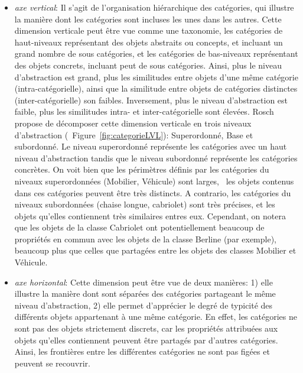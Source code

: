 \begin{itemize}
\item \textit{axe vertical}: Il s'agit de l'organisation hiérarchique des catégories, qui illustre la manière dont les catégories sont incluses les unes dans les autres. Cette dimension verticale peut être vue comme une taxonomie, les catégories de haut-niveaux représentant des objets abstraits ou concepts, et incluant un grand nombre de sous catégories, et les catégories de bas-niveaux représentant des objets concrets, incluant peut de sous catégories. Ainsi, plus le niveau d'abstraction est grand, plus les similitudes entre objets d'une même catégorie (intra-catégorielle), ainsi que la similitude entre objets de catégories distinctes (inter-catégorielle) son faibles. Inversement, plus le niveau d'abstraction est faible, plus les similitudes intra- et inter-catégorielle sont élevées. Rosch propose de décomposer cette dimension verticale en trois niveaux d'abstraction (\Cf~Figure~\ref{fig:categorieLVL}): Superordonné, Base et subordonné. Le niveau superordonné représente les catégories avec un haut niveau d'abstraction tandis que le niveau subordonné représente les catégories concrètes. On voit bien que les périmètres définis par les catégories du niveaux superordonnées (Mobilier, Véhicule) sont larges, \ie~les objets contenus dans ces catégories peuvent être très distincts. A contrario, les catégories du niveaux subordonnées (chaise longue, cabriolet) sont très précises, et les objets qu'elles contiennent très similaires entres eux. Cependant, on notera que les objets de la classe Cabriolet ont potentiellement beaucoup de propriétés en commun avec les objets de la classe Berline (par exemple), beaucoup plus que celles que partagées entre les objets des classes Mobilier et Véhicule. 
\item \textit{axe horizontal}: Cette dimension peut être vue de deux manières: 1) elle illustre la manière dont sont séparées des catégories partageant le même niveau d'abstraction, 2) elle permet d'apprécier le degré de typicité des différents objets appartenant à une même catégorie. En effet, les catégories ne sont pas des objets strictement discrets, car les propriétés attribuées aux objets qu'elles contiennent peuvent être partagés par d'autres catégories. Ainsi, les frontières entre les différentes catégories ne sont pas figées et peuvent se recouvrir. 
\end{itemize}

